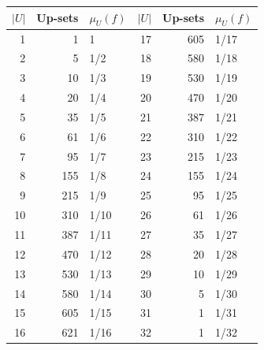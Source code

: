{\small
\begin{tabular}{@{}rrl@{\qquad}rrl@{}}
\toprule
$|U|$ & Up-sets & $\mu_U(f)$ & $|U|$ & Up-sets & $\mu_U(f)$ \\
\midrule
1 & 1 & 1 & 17 & 605 & 1/17 \\
2 & 5 & 1/2 & 18 & 580 & 1/18 \\
3 & 10 & 1/3 & 19 & 530 & 1/19 \\
4 & 20 & 1/4 & 20 & 470 & 1/20 \\
5 & 35 & 1/5 & 21 & 387 & 1/21 \\
6 & 61 & 1/6 & 22 & 310 & 1/22 \\
7 & 95 & 1/7 & 23 & 215 & 1/23 \\
8 & 155 & 1/8 & 24 & 155 & 1/24 \\
9 & 215 & 1/9 & 25 & 95 & 1/25 \\
10 & 310 & 1/10 & 26 & 61 & 1/26 \\
11 & 387 & 1/11 & 27 & 35 & 1/27 \\
12 & 470 & 1/12 & 28 & 20 & 1/28 \\
13 & 530 & 1/13 & 29 & 10 & 1/29 \\
14 & 580 & 1/14 & 30 & 5 & 1/30 \\
15 & 605 & 1/15 & 31 & 1 & 1/31 \\
16 & 621 & 1/16 & 32 & 1 & 1/32 \\
\bottomrule
\end{tabular}}
